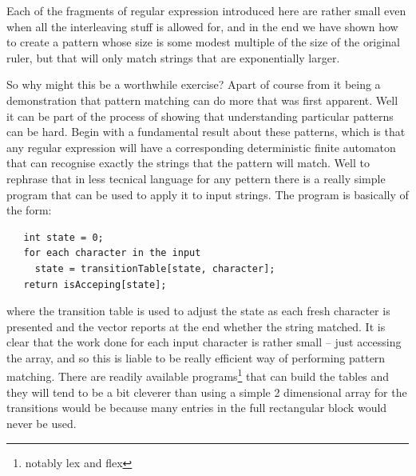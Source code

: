 Each of the fragments of regular expression introduced here are rather
small even when all the interleaving stuff is allowed for, and in the end
we have shown how to create a pattern whose size is some modest multiple
of the size of the original ruler, but that will only match strings that
are exponentially larger.

So why might this be a worthwhile exercise? Apart of course
from it being a demonstration that pattern matching can do more that
was first apparent. Well it can be part of the process of showing that
understanding particular patterns can be hard. Begin with a fundamental
result about these patterns, which is that any regular expression will
have a corresponding deterministic finite automaton that can recognise
exactly the strings that the pattern will match. Well to rephrase that
in less tecnical language for any pettern there is a really simple program
that can be used to apply it to input strings. The program is
basically of the form:
\begin{verbatim}
   int state = 0;
   for each character in the input
     state = transitionTable[state, character];
   return isAcceping[state];
\end{verbatim}
where the transition table is used to adjust the state as each fresh
character is presented and the \verb@isAccepting@ vector reports
at the end whether the string matched. It is clear that the work done
for each input character is rather small -- just accessing the
array, and so this is liable to be really efficient way of performing
pattern matching. There are readily available programs\footnote{notably
lex and flex} that can build the tables and they will tend to be a bit
cleverer than using a simple 2 dimensional array for the transitions would
be because many entries in the full rectangular block would never be used.

